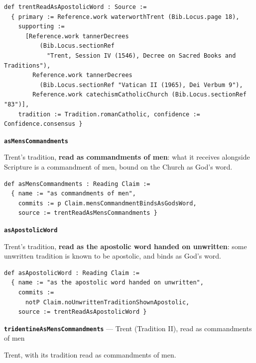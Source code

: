 \documentclass[11pt]{article}
\begin{document}
{\small\begin{verbatim}
def trentReadAsApostolicWord : Source :=
  { primary := Reference.work waterworthTrent (Bib.Locus.page 18),
    supporting :=
      [Reference.work tannerDecrees
          (Bib.Locus.sectionRef
            "Trent, Session IV (1546), Decree on Sacred Books and Traditions"),
        Reference.work tannerDecrees
          (Bib.Locus.sectionRef "Vatican II (1965), Dei Verbum 9"),
        Reference.work catechismCatholicChurch (Bib.Locus.sectionRef "83")],
    tradition := Tradition.romanCatholic, confidence := Confidence.consensus }
\end{verbatim}}
\par\medskip\noindent\textbf{\texttt{as\allowbreak{}Mens\allowbreak{}Commandments}}\par\nobreak\noindent
Trent’s tradition, \textbf{read as commandments of men}: what it receives alongside Scripture is a commandment of men, bound on the Church as God’s word.

{\small\begin{verbatim}
def asMensCommandments : Reading Claim :=
  { name := "as commandments of men",
    commits := p Claim.mensCommandmentBindsAsGodsWord,
    source := trentReadAsMensCommandments }
\end{verbatim}}
\par\medskip\noindent\textbf{\texttt{as\allowbreak{}Apostolic\allowbreak{}Word}}\par\nobreak\noindent
Trent’s tradition, \textbf{read as the apostolic word handed on unwritten}: some unwritten tradition is known to be apostolic, and binds as God’s word.

{\small\begin{verbatim}
def asApostolicWord : Reading Claim :=
  { name := "as the apostolic word handed on unwritten",
    commits :=
      notP Claim.noUnwrittenTraditionShownApostolic,
    source := trentReadAsApostolicWord }
\end{verbatim}}
\par\medskip\noindent\textbf{\texttt{tridentine\allowbreak{}As\allowbreak{}Mens\allowbreak{}Commandments}} --- Trent (Tradition II), read as commandments of men\par\nobreak\noindent
Trent, with its tradition read as commandments of men.
\end{document}
